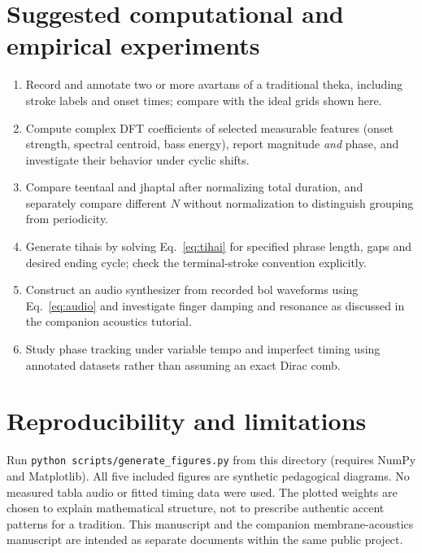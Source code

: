 \documentclass[11pt,letterpaper]{article}
\begin{document}
\section{Suggested computational and empirical experiments}
\begin{enumerate}
\item Record and annotate two or more avartans of a traditional theka, including stroke labels and onset times; compare with the ideal grids shown here.
\item Compute complex DFT coefficients of selected measurable features (onset strength, spectral centroid, bass energy), report magnitude \emph{and} phase, and investigate their behavior under cyclic shifts.
\item Compare teentaal and jhaptal after normalizing total duration, and separately compare different $N$ without normalization to distinguish grouping from periodicity.
\item Generate tihais by solving Eq.~\eqref{eq:tihai} for specified phrase length, gaps and desired ending cycle; check the terminal-stroke convention explicitly.
\item Construct an audio synthesizer from recorded bol waveforms using Eq.~\eqref{eq:audio} and investigate finger damping and resonance as discussed in the companion acoustics tutorial.
\item Study phase tracking under variable tempo and imperfect timing using annotated datasets rather than assuming an exact Dirac comb.
\end{enumerate}

\section*{Reproducibility and limitations}
Run \texttt{python scripts/generate\_figures.py} from this directory (requires NumPy and Matplotlib). All five included figures are synthetic pedagogical diagrams. No measured tabla audio or fitted timing data were used. The plotted weights are chosen to explain mathematical structure, not to prescribe authentic accent patterns for a tradition. This manuscript and the companion membrane-acoustics manuscript are intended as separate documents within the same public project.
\end{document}
